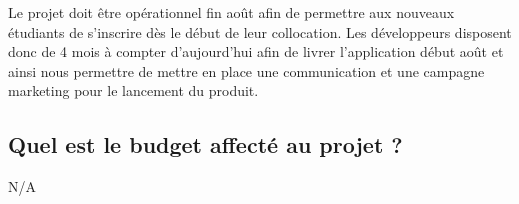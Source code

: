 	Le projet doit être opérationnel fin août afin de permettre aux nouveaux étudiants de s'inscrire dès le début de leur collocation. Les développeurs disposent donc de 4 mois à compter d'aujourd'hui afin de livrer l'application début août et ainsi nous permettre de mettre en place une communication et une campagne marketing pour le lancement du produit.


\subsection{Quel est le budget affecté au projet ?} %
\label{sub:quel_est_le_budget_affect_au_projet}

	N/A
	

